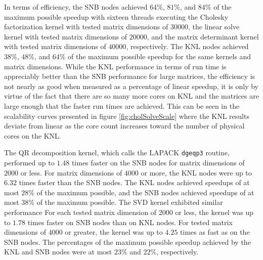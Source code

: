 In terms of efficiency, the SNB nodes achieved $64\%$, $81\%$, and $84\%$ of the maximum
possible speedup with sixteen threads executing the Cholesky factorization kernel with
tested matrix dimensions of $30000$, the linear solve kernel with tested matrix dimensions
of $20000$, and the matrix determinant kernel with tested matrix dimensions of $40000$,
respectively. The KNL nodes achieved $38\%$, $48\%$, and $64\%$ of the maximum possible
speedup for the same kernels and matrix dimensions. While the KNL performance in terms of
run time is appreciably better than the SNB performance for large matrices, the efficiency
is not nearly as good when measured as a percentage of linear speedup, it is only by
virtue of the fact that there are so many more cores on KNL and the matrices are large
enough that the faster run times are achieved. This can be seen in the scalability curves
presented in figure \ref{fig:cholSolveScale} where the KNL results deviate from linear as
the core count increases toward the number of physical cores on the KNL.

The QR decomposition kernel, which calls the LAPACK \texttt{dgeqp3} routine, performed up
to $1.48$ times faster on the SNB nodes for matrix dimensions of $2000$ or less. For
matrix dimensions of $4000$ or more, the KNL nodes were up to $6.32$ times faster than the
SNB nodes. The KNL nodes achieved speedups of at most $28\%$ of the maximum possible, and
the SNB nodes achieved speedups of at most $38\%$ of the maximum possible. The SVD kernel
exhibited similar performance For each tested matrix dimension of $2000$ or less, the
kernel was up to $1.78$ times faster on SNB nodes than on KNL nodes. For tested matrix
dimensions of $4000$ or greater, the kernel was up to $4.25$ times as fast as on the SNB
nodes. The percentages of the maximum possible speedup achieved by the KNL and SNB nodes
were at most $23\%$ and $22\%$, respectively.

